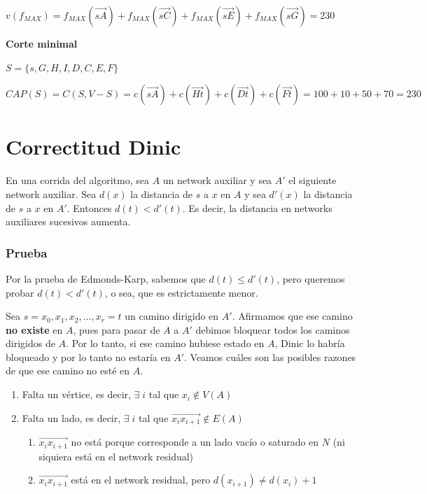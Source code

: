 \documentclass[10pt,a4paper]{article}
\begin{document}
\textbf{$v(f_{MAX}) = f_{MAX} (\overrightarrow{sA}) + f_{MAX} (\overrightarrow{sC}) + f_{MAX} (\overrightarrow{sE}) + f_{MAX} (\overrightarrow{sG}) = 230$}

\textbf{Corte minimal}

\textbf{$S= \{s, G, H, I, D, C, E, F\}
$}

\textbf{$CAP(S) = C(S, V- S) = c(\overrightarrow{sA}) + c(\overrightarrow{Ht}) + c(\overrightarrow{Dt}) + c(\overrightarrow{Ft}) = 100 + 10 + 50 + 70 = 230$}

\section*{Correctitud Dinic}

En una corrida del algoritmo, sea $A$ un network auxiliar y sea $A'$ el siguiente network auxiliar. Sea $d(x)$ la distancia de $s$ a $x$ en $A$ y sea $d'(x)$ la distancia de $s$ a $x$ en $A'$. Entonces $d(t) < d'(t)$. Es decir, la distancia en networks auxiliares sucesivos aumenta.

\subsubsection*{Prueba}

Por la prueba de Edmonds-Karp, sabemos que $d(t) \leq d'(t)$, pero queremos probar $d(t) < d'(t)$, o sea, que es estrictamente menor.

Sea $s=x_0, x_1, x_2,\dots, x_r=t$ un camino dirigido en $A'$. Afirmamos que ese camino \textbf{no existe} en $A$, pues para pasar de $A$ a $A'$ debimos bloquear todos los caminos dirigidos de $A$. Por lo tanto, si ese camino hubiese estado en $A$, Dinic lo habría bloqueado y por lo tanto no estaría en $A'$. Veamos cuáles son las posibles razones de que ese camino no esté en $A$.

\begin{enumerate}

	\item Falta un vértice, es decir, $\exists\;i$ tal que $x_i\not\in V(A)$
	\item Falta un lado, es decir, $\exists\;i$ tal que $\overrightarrow{x_ix_{i+1}} \not \in E(A) $
	\begin{enumerate}

		\item $\overrightarrow{x_ix_{i+1}}$ no está porque corresponde a un lado vacío o saturado en $N$ (ni siquiera está en el network residual)
		\item $\overrightarrow{x_ix_{i+1}}$ está en el network residual, pero $d(x_{i+1})\neq d(x_i) + 1$
	\end{enumerate}
	
\end{enumerate}
\end{document}
